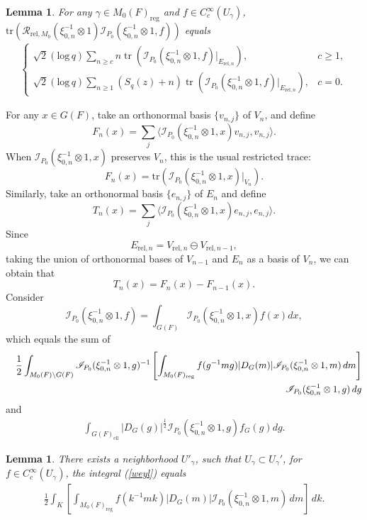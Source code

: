 \documentclass[11pt]{amsart}
\newtheorem {lemma}      [theorem]    {Lemma}
\renewcommand{\rm}{\mathrm}
\theoremstyle{definition}
\numberwithin{equation}{section}
\begin{document}
	\begin{lemma}
		For any \(\gamma\in M_0(F)_{\rm{reg}}\) and \(f\in C_c^\infty(U_\gamma)\), \(\rm{tr} ( \mathscr{R}_{\rm{rel},M_0}(\xi_{0,n}^{-1}\otimes 1) \mathscr{I}_{P_0}(\xi_{0,n}^{-1}\otimes 1,f) )\) equals
		\begin{align*}
			\begin{cases}
				\sqrt{2}(\rm{log}\,q) \sum_{n \ge c} n \operatorname{tr} \left( \mathscr{I}_{P_0}(\xi_{0,n}^{-1}\otimes 1,f)|_{E_{\mathrm{rel},n}} \right), & c \ge 1, \\
				\sqrt{2}(\rm{log}\,q) \sum_{n \ge 1} (S_q(z) + n) \operatorname{tr} \left( \mathscr{I}_{P_0}(\xi_{0,n}^{-1}\otimes 1,f)|_{E_{\mathrm{rel},n}} \right), & c = 0.
			\end{cases}
		\end{align*}
	\end{lemma}
	For any \(x \in G(F)\), take an orthonormal basis \(\{v_{n,j}\}\) of \(V_n\), and define
	\[
	F_n(x) = \sum_j \langle \mathscr{I}_{P_0}(\xi_{0,n}^{-1}\otimes 1,x)v_{n,j}, v_{n,j} \rangle.
	\]
	When \(\mathscr{I}_{P_0}(\xi_{0,n}^{-1}\otimes 1,x)\) preserves \(V_n\), this is the usual restricted trace:
	\[
	F_n(x) = \rm{tr} \left( \mathscr{I}_{P_0}(\xi_{0,n}^{-1}\otimes 1,x)|_{V_n} \right).
	\]
	Similarly, take an orthonormal basis \(\{e_{n,j}\}\) of \(E_n\) and define 
	\[
	T_n(x) = \sum_{j} \langle \mathscr{I}_{P_0}(\xi_{0,n}^{-1}\otimes 1,x) e_{n,j}, e_{n,j} \rangle.
	\]
	Since
	\[
	E_{\rm{rel},n} = V_{\rm{rel},n} \ominus V_{\rm{rel},n-1},
	\]
	taking the union of orthonormal bases of \(V_{n-1}\) and \(E_n\) as a basis of \(V_n\), we can obtain that
	\[
	T_n(x) = F_n(x) - F_{n-1}(x).\]
	Consider \[\mathscr{I}_{P_0}(\xi_{0,n}^{-1}\otimes 1,f)=\int_{G(F)}\mathscr{I}_{P_0}(\xi_{0,n}^{-1}\otimes 1,x)f(x)dx,\]
	which equals the sum of 
	\begin{align}\label{weyl}
		&&\frac{1}{2} \int_{M_0(F)\backslash G(F)} \mathscr{I}_{P_0}(\xi_{0,n}^{-1}\otimes 1,g)^{-1}\left[ \int_{M_0(F)_{\mathrm{reg}}} f(g^{-1}mg) |D_G(m)| \mathscr{I}_{P_0}(\xi_{0,n}^{-1}\otimes 1,m) \, dm \right] \\\notag
		&&\mathscr{I}_{P_0}(\xi_{0,n}^{-1}\otimes 1,g) \, dg
	\end{align}
	and 
	\begin{align*}
		\int_{G(F)_{\rm{ell}}}|D_G(g)|^{\frac{1}{2}}\mathscr{I}_{P_0}(\xi_{0,n}^{-1}\otimes 1,g)f_G(g)dg.
	\end{align*}
	\begin{lemma}
		There exists a neighborhood \(U'_{\gamma}\), such that \(U_\gamma\subset U_\gamma'\), for \(f\in C_c^\infty(U_\gamma)\), the integral (\ref{weyl}) equals 
		\begin{align}\label{weyl2}
			\frac{1}{2} \int_{K} \left[ \int_{M_0(F)_{\mathrm{reg}}} f(k^{-1}mk) |D_G(m)| \mathscr{I}_{P_0}(\xi_{0,n}^{-1}\otimes 1,m) \, dm \right] \, dk.
		\end{align}
	\end{lemma}
\end{document}
